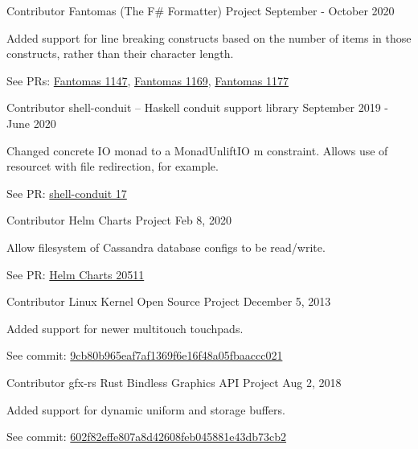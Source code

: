 
\begin{cventries}

  \cventry
  {Contributor}
  {Fantomas (The F\# Formatter) Project}
  {}
  {September - October 2020}
  {
    \begin{cvitems}
      \item{Added support for line breaking constructs based on the number of items in those constructs, rather than their character length.}
      \item{See PRs: \href{https://github.com/fsprojects/fantomas/pull/1147}{Fantomas 1147}, \href{https://github.com/fsprojects/fantomas/pull/1169}{Fantomas 1169}, \href{https://github.com/fsprojects/fantomas/pull/1177}{Fantomas 1177}}
    \end{cvitems}
  }

  \cventry
  {Contributor}
  {shell-conduit -- Haskell conduit support library}
  {}
  {September 2019 - June 2020}
  {
    \begin{cvitems}
      \item{Changed concrete IO monad to a MonadUnliftIO m constraint.  Allows use of resourcet with file redirection, for example.}
      \item{See PR: \href{https://github.com/psibi/shell-conduit/pull/17}{shell-conduit 17}}
    \end{cvitems}
  } 

  \cventry
  {Contributor}
  {Helm Charts Project}
  {}
  {Feb 8, 2020}
  {
    \begin{cvitems}
      \item{Allow filesystem of Cassandra database configs to be read/write.}
      \item{See PR: \href{https://github.com/helm/charts/pull/20511}{Helm Charts 20511}}
    \end{cvitems}
  }

  \cventry
  {Contributor}
  {Linux Kernel Open Source Project}
  {}
  {December 5, 2013}
  {
    \begin{cvitems}
      \item{Added support for newer multitouch touchpads.}
      \item{See commit: \href{https://kernel.googlesource.com/pub/scm/linux/kernel/git/clk/linux/+/9cb80b965eaf7af1369f6e16f48a05fbaaccc021}{9cb80b965eaf7af1369f6e16f48a05fbaaccc021}}
    \end{cvitems}
  }

  \cventry
  {Contributor}
  {gfx-rs Rust Bindless Graphics API Project}
  {}
  {Aug 2, 2018}
  {
    \begin{cvitems}
    \item{Added support for dynamic uniform and storage buffers.}
    \item{See commit: \href{https://github.com/gfx-rs/gfx/commit/602f82effe807a8d42608feb045881e43db73cb2}{602f82effe807a8d42608feb045881e43db73cb2}}
    \end{cvitems}
  }
  
\end{cventries}
    
